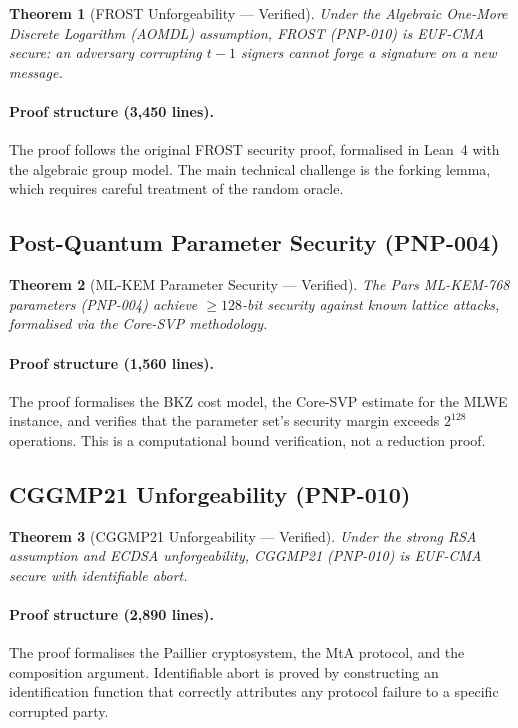 \documentclass[11pt,a4paper]{article}
\newtheorem{theorem}{Theorem}[section]
\begin{document}
\begin{theorem}[FROST Unforgeability --- Verified]
\label{thm:frost}
    Under the Algebraic One-More Discrete Logarithm (AOMDL) assumption,
    FROST (PNP-010) is EUF-CMA secure: an adversary corrupting $t-1$
    signers cannot forge a signature on a new message.
\end{theorem}

\paragraph{Proof structure (3{,}450 lines).}
The proof follows the original FROST security proof, formalised in
Lean~4 with the algebraic group model.  The main technical challenge
is the forking lemma, which requires careful treatment of the random
oracle.

\subsection{Post-Quantum Parameter Security (PNP-004)}

\begin{theorem}[ML-KEM Parameter Security --- Verified]
\label{thm:mlkem}
    The Pars ML-KEM-768 parameters (PNP-004) achieve $\geq 128$-bit
    security against known lattice attacks, formalised via the Core-SVP
    methodology.
\end{theorem}

\paragraph{Proof structure (1{,}560 lines).}
The proof formalises the BKZ cost model, the Core-SVP estimate for the
MLWE instance, and verifies that the parameter set's security margin
exceeds $2^{128}$ operations.  This is a computational bound
verification, not a reduction proof.

\subsection{CGGMP21 Unforgeability (PNP-010)}

\begin{theorem}[CGGMP21 Unforgeability --- Verified]
\label{thm:cggmp}
    Under the strong RSA assumption and ECDSA unforgeability, CGGMP21
    (PNP-010) is EUF-CMA secure with identifiable abort.
\end{theorem}

\paragraph{Proof structure (2{,}890 lines).}
The proof formalises the Paillier cryptosystem, the MtA protocol, and
the composition argument.  Identifiable abort is proved by constructing
an identification function that correctly attributes any protocol
failure to a specific corrupted party.
\end{document}
